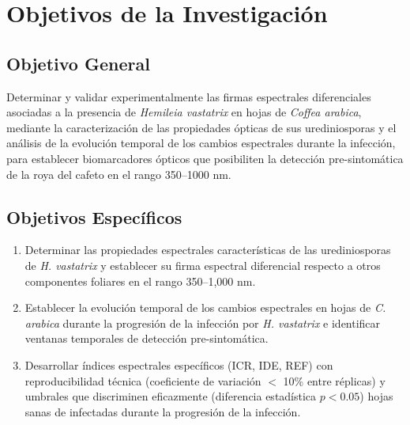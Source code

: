 \documentclass[12pt, a4paper]{article}
\begin{document}
	
	\section{Objetivos de la Investigación}
	
	
	\subsection{Objetivo General}
	Determinar y validar experimentalmente las firmas espectrales diferenciales asociadas a la presencia de \textit{Hemileia vastatrix} en hojas de \textit{Coffea arabica}, mediante la caracterización de las propiedades ópticas de sus urediniosporas y el análisis de la evolución temporal de los cambios espectrales durante la infección, para establecer biomarcadores ópticos que posibiliten la detección pre-sintomática de la roya del cafeto en el rango 350--1000 nm.
	
	\subsection{Objetivos Específicos}
	\begin{enumerate}
		\item Determinar las propiedades espectrales características de las urediniosporas de \textit{H. vastatrix} y establecer su firma espectral diferencial respecto a otros componentes foliares en el rango 350–1,000 nm.
		
		\item Establecer la evolución temporal de los cambios espectrales en hojas de \textit{C. arabica} durante la progresión de la infección por \textit{H. vastatrix} e identificar ventanas temporales de detección pre-sintomática.
		
		\item Desarrollar índices espectrales específicos (ICR, IDE, REF) con reproducibilidad técnica (coeficiente de variación $<$ 10\% entre réplicas) y umbrales que discriminen eficazmente (diferencia estadística $p < 0.05$) hojas sanas de infectadas durante la progresión de la infección.
	\end{enumerate}
	
	
	
	
\end{document}
